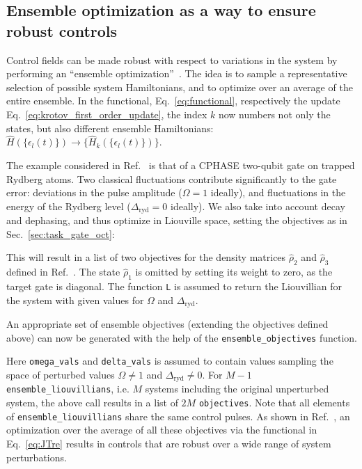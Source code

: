 \documentclass[submission, Phys]{SciPost}
\newcommand{\Op}[1]{\hat{#1}}
\begin{document}
\subsection{Ensemble optimization as a way to ensure robust controls}%
\label{sec:task_ensemble_oct}

Control fields can be made robust with respect to variations in the system by
performing an ``ensemble optimization''~\cite{GoerzPRA2014}.
The idea is to sample a representative selection of possible system
Hamiltonians, and to optimize over an average of the entire ensemble.
In the functional, Eq.~\eqref{eq:functional}, respectively the update
Eq.~\eqref{eq:krotov_first_order_update}, the index $k$ now numbers not only the
states, but also different ensemble Hamiltonians: \(\Op{H}(\{\epsilon_l(t)\})
\rightarrow \{\Op{H}_k(\{\epsilon_l(t)\})\}\).


The example considered in Ref.~\cite{GoerzPRA2014} is that of a CPHASE two-qubit
gate on trapped Rydberg atoms.
Two classical fluctuations contribute significantly to the gate error:
deviations in the pulse amplitude ($\Omega = 1$ ideally), and fluctuations in
the energy of the Rydberg level ($\Delta_{\text{ryd}} = 0$ ideally). We also
take into account decay and dephasing, and thus optimize in Liouville space,
setting the objectives as in Sec.~\ref{sec:task_gate_oct}:

This will result in a list of two objectives
for the density matrices $\Op{\rho}_2$ and $\Op{\rho}_3$ defined in
Ref.~\cite{GoerzNJP2014}.
The state $\Op{\rho}_1$ is omitted by setting its weight to zero, as the target
gate is diagonal.
The function \texttt{L} is assumed to return the Liouvillian for the system with
given values for $\Omega$ and $\Delta_{\text{ryd}}$.

An appropriate set of ensemble objectives (extending the objectives defined
above) can now be generated with the help of the \texttt{ensemble\_objectives}
function.

Here \texttt{omega\_vals} and
\texttt{delta\_vals} is assumed to contain values sampling the space of
perturbed values $\Omega \neq 1$ and $\Delta_{\text{ryd}} \neq 0$.
For $M-1$ \texttt{ensemble\_liouvillians}, i.e.
$M$ systems including the original unperturbed system, the above call results in
a list of $2M$ \texttt{objectives}.
Note that all elements of \texttt{ensemble\_liouvillians} share the same control
pulses.
As shown in Ref.~\cite{GoerzNJP2014}, an optimization over the average of all
these objectives via the functional in Eq.~\eqref{eq:JTre} results in controls
that are robust over a wide range of system perturbations.
\end{document}
